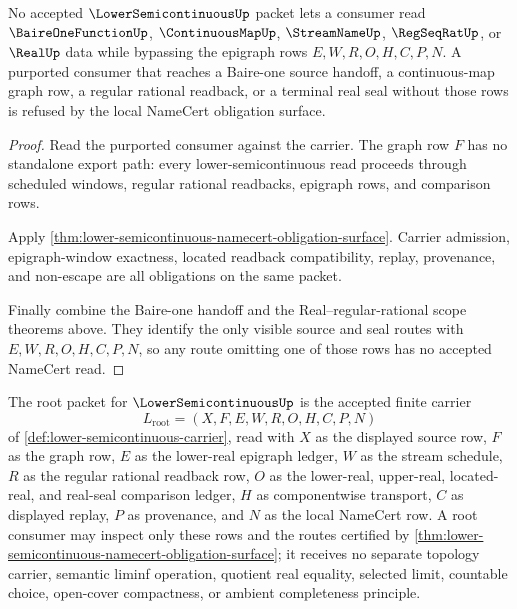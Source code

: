 \begin{theorem}
\label{thm:lower-semicontinuous-epigraph-ledger-refusal}
No accepted $\LowerSemicontinuousUp$ packet lets a consumer read
$\BaireOneFunctionUp$, $\ContinuousMapUp$, $\StreamNameUp$, $\RegSeqRatUp$, or
$\RealUp$ data while bypassing the epigraph rows $E,W,R,O,H,C,P,N$. A purported
consumer that reaches a Baire-one source handoff, a continuous-map graph row, a
regular rational readback, or a terminal real seal without those rows is refused
by the local NameCert obligation surface.
\end{theorem}
\begin{proof}
Read the purported consumer against the carrier. The graph row $F$ has no
standalone export path: every lower-semicontinuous read proceeds through
scheduled windows, regular rational readbacks, epigraph rows, and comparison
rows.

Apply \autoref{thm:lower-semicontinuous-namecert-obligation-surface}. Carrier
admission, epigraph-window exactness, located readback compatibility, replay,
provenance, and non-escape are all obligations on the same packet.

Finally combine the Baire-one handoff and the Real--regular-rational scope
theorems above. They identify the only visible source and seal routes with
$E,W,R,O,H,C,P,N$, so any route omitting one of those rows has no accepted
NameCert read.
\end{proof}

\begin{definition}
\label{def:lowersemicontinuous-root-carrier}
The root packet for $\LowerSemicontinuousUp$ is the accepted finite carrier
$$
L_{\mathrm{root}}=(X,F,E,W,R,O,H,C,P,N)
$$
of \autoref{def:lower-semicontinuous-carrier}, read with $X$ as the displayed
source row, $F$ as the graph row, $E$ as the lower-real epigraph ledger, $W$ as
the stream schedule, $R$ as the regular rational readback row, $O$ as the
lower-real, upper-real, located-real, and real-seal comparison ledger, $H$ as
componentwise transport, $C$ as displayed replay, $P$ as provenance, and $N$ as
the local NameCert row. A root consumer may inspect only these rows and the
routes certified by \autoref{thm:lower-semicontinuous-namecert-obligation-surface};
it receives no separate topology carrier, semantic liminf operation, quotient
real equality, selected limit, countable choice, open-cover compactness, or
ambient completeness principle.
\end{definition}

